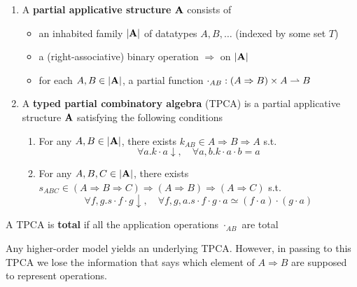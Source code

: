 \documentclass[11pt]{article}
\begin{document}
\begin{definition}[]
\label{3.1.16}
\begin{enumerate}
\item A \textbf{partial applicative structure} \(\operatorname{\textbf{A}}\) consists of
\begin{itemize}
\item an inhabited family \(\abs{\bA}\) of datatypes \(A,B,\dots\) (indexed by some set \(T\))
\item a (right-associative) binary operation \(\Rightarrow\) on \(\abs{\bA}\)
\item for each \(A,B\in\abs{\bA}\), a partial function \(\cdot_{AB}:(A\Rightarrow B)\times A\rightharpoonup B\)
\end{itemize}
\item A \textbf{typed partial combinatory algebra} (TPCA) is a partial applicative structure \(\operatorname{\textbf{A}}\)
satisfying the following conditions
\begin{enumerate}
\item For any \(A,B\in\abs{\bA}\), there exists \(k_{AB}\in A\Rightarrow B\Rightarrow A\) s.t.
\begin{equation*}
\forall a.k\cdot a\downarrow,\quad\forall a,b.k\cdot a\cdot b=a
\end{equation*}
\item For any \(A,B,C\in\abs{\bA}\), there exists \(s_{ABC}\in(A\Rightarrow B\Rightarrow C)\Rightarrow(A\Rightarrow B)\Rightarrow(A\Rightarrow C)\) s.t.
\begin{equation*}
\forall f,g. s\cdot f\cdot g\downarrow,\quad\forall f,g,a.s\cdot f\cdot g\cdot a\simeq(f\cdot a)\cdot(g\cdot a)
\end{equation*}
\end{enumerate}
\end{enumerate}


A TPCA is \textbf{total} if all the application operations \(\cdot_{AB}\) are total
\end{definition}

Any higher-order model yields an underlying TPCA. However, in passing to this TPCA we lose the
information that says which element of \(A\Rightarrow B\) are supposed to represent operations.
\end{document}
